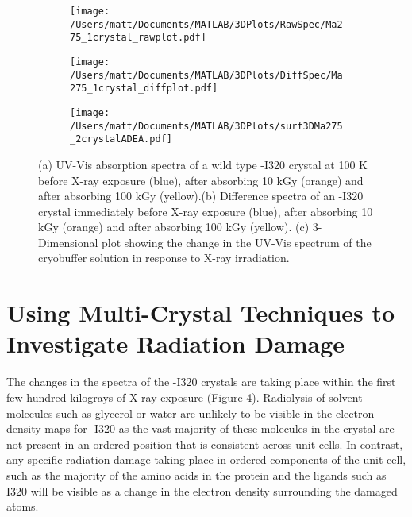 \begin{figure}[!htbp]
\centering
\begin{subfigure}{.33\textwidth}
  \centering
  \texttt{[image: /Users/matt/Documents/MATLAB/3DPlots/RawSpec/Ma275\_1crystal\_rawplot.pdf]}
  \caption{}
  \label{fig:I320GOLCrystal_raw}
\end{subfigure}%
\begin{subfigure}{.33\textwidth}
  \centering
  \texttt{[image: /Users/matt/Documents/MATLAB/3DPlots/DiffSpec/Ma275\_1crystal\_diffplot.pdf]}
  \caption{}
  \label{fig:I320GOLCrystal_diff}
\end{subfigure}
\begin{subfigure}{.33\textwidth}
  \centering
  \texttt{[image: /Users/matt/Documents/MATLAB/3DPlots/surf3DMa275\_2crystalADEA.pdf]}
  \caption{}
  \label{fig:I320GOLCrystal_3Dplot}
\end{subfigure}
\caption[UV-Vis Spectra of X-ray irradiated \atpdx -I320 crystals]{(a) UV-Vis absorption spectra of a wild type \atpdx -I320 crystal at 100 K before X-ray exposure (blue), after absorbing 10 \si{\kilo\gray} (orange) and after absorbing 100 \si{\kilo\gray} (yellow).(b) Difference spectra of an \atpdx -I320 crystal immediately before X-ray exposure (blue), after absorbing 10 \si{\kilo\gray} (orange) and after absorbing 100 \si{\kilo\gray} (yellow). (c) 3-Dimensional plot showing the change in the UV-Vis spectrum of the cryobuffer solution in response to X-ray irradiation.}
\end{figure}

\clearpage

\section{Using Multi-Crystal Techniques to Investigate Radiation Damage}
\label{sec:MultiXtal}
The changes in the spectra of the \atpdx -I320 crystals are taking place within the first few hundred kilograys of X-ray exposure (Figure \ref{fig:I320GOLCrystal_3Dplot}). Radiolysis of solvent molecules such as glycerol or water are unlikely to be visible in the electron density maps for \atpdx -I320 as the vast majority of these molecules in the crystal are not present in an ordered position that is consistent across unit cells. In contrast, any specific radiation damage taking place in ordered components of the unit cell, such as the majority of the amino acids in the protein and the ligands such as I320 will be visible as a change in the electron density surrounding the damaged atoms. 

